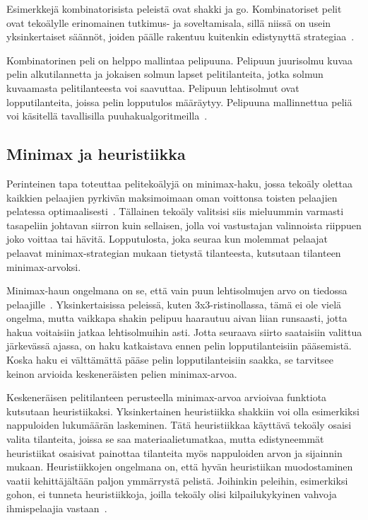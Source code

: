 \documentclass[12pt,finnish]{tktltiki2}
\theoremstyle{definition}
\theoremstyle{remark}
\begin{document}
Esimerkkejä kombinatorisista peleistä ovat shakki ja go. Kombinatoriset pelit ovat tekoälylle erinomainen tutkimus- ja soveltamisala, sillä niissä on usein yksinkertaiset säännöt, joiden päälle rakentuu kuitenkin edistynyttä strategiaa~\cite{browne}.

Kombinatorinen peli on helppo mallintaa pelipuuna. Pelipuun juurisolmu kuvaa pelin alkutilannetta ja jokaisen solmun lapset pelitilanteita, jotka solmun kuvaamasta pelitilanteesta voi saavuttaa. Pelipuun lehtisolmut ovat lopputilanteita, joissa pelin lopputulos määräytyy. Pelipuuna mallinnettua peliä voi käsitellä tavallisilla puuhakualgoritmeilla~\cite{aima}.

\subsection{Minimax ja heuristiikka}

Perinteinen tapa toteuttaa pelitekoälyjä on minimax-haku, jossa tekoäly olettaa kaikkien pelaajien pyrkivän maksimoimaan oman voittonsa toisten pelaajien pelatessa optimaalisesti~\cite{aima}. Tällainen tekoäly valitsisi siis mieluummin varmasti tasapeliin johtavan siirron kuin sellaisen, jolla voi vastustajan valinnoista riippuen joko voittaa tai hävitä. Lopputulosta, joka seuraa kun molemmat pelaajat pelaavat minimax-strategian mukaan tietystä tilanteesta, kutsutaan tilanteen minimax-arvoksi.

Minimax-haun ongelmana on se, että vain puun lehtisolmujen arvo on tiedossa pelaajille~\cite{aima}. Yksinkertaisissa peleissä, kuten 3x3-ristinollassa, tämä ei ole vielä ongelma, mutta vaikkapa shakin pelipuu haarautuu aivan liian runsaasti, jotta hakua voitaisiin jatkaa lehtisolmuihin asti. Jotta seuraava siirto saataisiin valittua järkevässä ajassa, on haku katkaistava ennen pelin lopputilanteisiin pääsemistä. Koska haku ei välttämättä pääse pelin lopputilanteisiin saakka, se tarvitsee keinon arvioida keskeneräisten pelien minimax-arvoa.

Keskeneräisen pelitilanteen perusteella minimax-arvoa arvioivaa funktiota kutsutaan heuristiikaksi. Yksinkertainen heuristiikka shakkiin voi olla esimerkiksi nappuloiden lukumäärän laskeminen. Tätä heuristiikkaa käyttävä tekoäly osaisi valita tilanteita, joissa se saa materiaalietumatkaa, mutta edistyneemmät heuristiikat osaisivat painottaa tilanteita myös nappuloiden arvon ja sijainnin mukaan. Heuristiikkojen ongelmana on, että hyvän heuristiikan muodostaminen vaatii kehittäjältään paljon ymmärrystä pelistä. Joihinkin peleihin, esimerkiksi gohon, ei tunneta heuristiikkoja, joilla tekoäly olisi kilpailukykyinen vahvoja ihmispelaajia vastaan~\cite{browne}.
\end{document}
